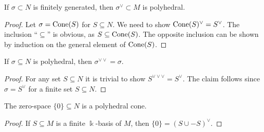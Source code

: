 \begin{proposition}
  \label{3-dual-polyhedral}
  \leanok
  If \( \sigma \subset N \) is finitely generated, then \( \sigma^\vee
  \subset M \) is polyhedral.
\end{proposition}
\begin{proof}
  \uses{}
  \leanok
  Let \( \sigma = \operatorname{Cone}(S) \) for \( S \subseteq N \). We need to show
  \( \operatorname{Cone}(S)^\vee = S^\vee \). The inclusion ``\( \subseteq \)'' is
  obvious, as \( S \subseteq \operatorname{Cone}(S) \). The opposite inclusion can
  be shown by induction on the general element of \( \operatorname{Cone}(S) \).
\end{proof}

\begin{proposition}
  \label{3-double-dual-polyhedral-cone}
  \leanok
  If \( \sigma \subseteq N \) is polyhedral, then \( \sigma^{\vee\vee}
  = \sigma \).
\end{proposition}
\begin{proof}
  \uses{}
  \leanok
  For any set \( S \subseteq N \) it is trivial to show \(
  S^{\vee\vee\vee} = S^{\vee} \). The claim follows since \( \sigma =
  S^{\vee} \) for a finite set \( S \subseteq N \).
\end{proof}

\begin{proposition}
  \label{3-bot-polyhedral}
  \leanok
  The zero-space \( \{0\} \subseteq N \) is a polyhedral cone.
\end{proposition}
\begin{proof}
  \uses{}
  \leanok
  If \( S \subseteq M \) is a finite \( \Bbbk \)-basis of \( M \),
  then \( \{0\} = (S \cup -S)^\vee \).
\end{proof}

